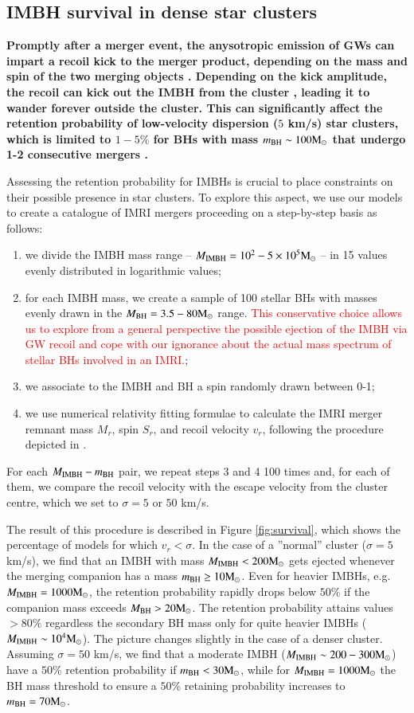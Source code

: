 \documentclass[article]{aa}
\newcommand{\Ms}{{\rm M}_\odot}
\newcommand{\ibh}{{\rm IMBH}}
\newcommand{\bh}{{\rm BH}}
\newcommand{\manuel}{\textcolor{red}}
\begin{document}
\subsection{IMBH survival in dense star clusters}
{\bf
Promptly after a merger event, the anysotropic emission of GWs can impart a recoil kick to the merger product, depending on the mass and spin of the two merging objects \citep{campanelli07,gonzalez07,lousto08,lousto12}. Depending on the kick amplitude, the recoil can kick out the IMBH from the cluster \citep[e.g.][]{bockelmann08,fragione17c}, leading it to wander forever outside the cluster. 
This can significantly affect the retention probability of low-velocity dispersion ($5$ km/s) star clusters, which is limited to $1-5\%$ for BHs with mass $m_\bh \sim 100 \Ms$ that undergo 1-2 consecutive mergers \citep{arca20}. 

Assessing the retention probability for IMBHs is crucial to place constraints on their possible presence in star clusters. To explore this aspect, we use our models to create a catalogue of IMRI mergers proceeding on a step-by-step basis as follows: 
\begin{enumerate}
\item we divide the IMBH mass range -- $M_\ibh = 10^2-5\times 10^5\Ms$ -- in 15 values evenly distributed in logarithmic values;
\item for each IMBH mass, we create a sample of 100 stellar BHs with masses evenly drawn in the $M_\bh = 3.5-80 \Ms$ range. \manuel{This conservative choice allows us to explore from a general perspective the possible ejection of the IMBH via GW recoil and cope with our ignorance about the actual mass spectrum of stellar BHs involved in an IMRI.};
\item we associate to the IMBH and BH a spin randomly drawn between 0-1;
\item we use \cite{jimenez17} numerical relativity fitting formulae to calculate the IMRI merger remnant mass $M_r$, spin $S_r$, and recoil velocity $v_r$, following the procedure depicted in \cite{arca20}.
\end{enumerate}
For each $M_\ibh -m_\bh$ pair, we repeat steps 3 and 4 100 times and, for each of them, we compare the recoil velocity with the escape velocity from the cluster centre, which we set to $\sigma = 5$ or $50$ km/s. 

The result of this procedure is described in Figure \ref{fig:survival}, which shows the percentage of models for which $v_r < \sigma$. In the case of 
a ''normal'' cluster ($\sigma = 5$ km/s), we find that an IMBH with mass $M_\ibh < 200 \Ms$ gets ejected whenever the merging companion has a mass $m_\bh \geq 10 \Ms$. Even for heavier IMBHs, e.g. $M_\ibh = 1000\Ms$, the retention probability rapidly drops below $50\%$  if the companion mass exceeds $M_\bh > 20\Ms$. The retention probability attains values $>80\%$ regardless the secondary BH mass only for quite heavier IMBHs ($M_\ibh \sim 10^4\Ms$). The picture changes slightly in the case of a denser cluster. Assuming $\sigma=50$ km/s, we find that a moderate IMBH ($M_\ibh \sim 200-300 \Ms$) have a $50\%$ retention probability if $m_\bh < 30\Ms$, while for $M_\ibh = 1000\Ms$ the BH mass threshold to ensure a $50\%$ retaining probability increases to $m_\bh = 70\Ms$.

}
\end{document}
